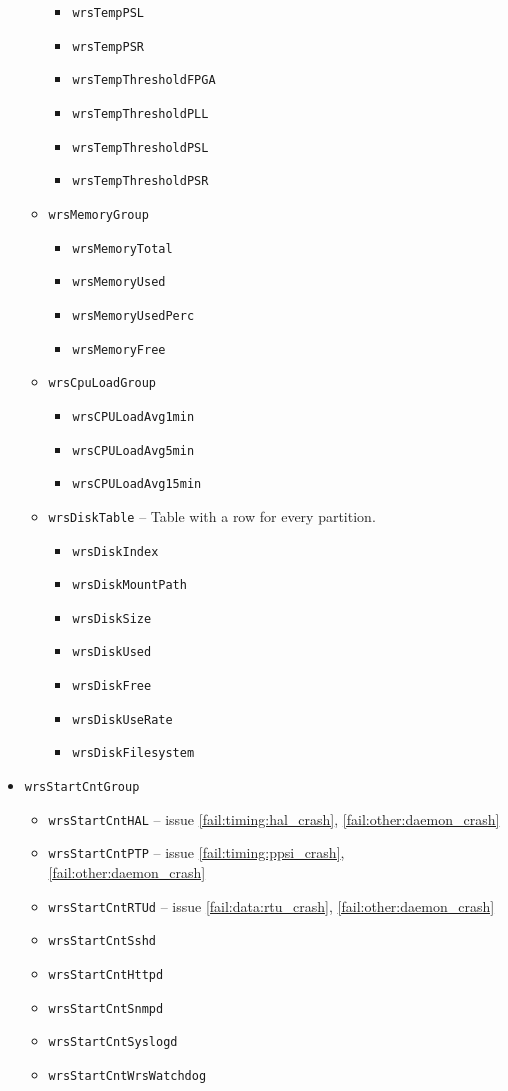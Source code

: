 \begin{itemize}
\begin{itemize}
\begin{itemize}
	  \item \texttt{wrsTempPSL}
	  \item \texttt{wrsTempPSR}
	  \item \texttt{wrsTempThresholdFPGA}
	  \item \texttt{wrsTempThresholdPLL}
	  \item \texttt{wrsTempThresholdPSL}
	  \item \texttt{wrsTempThresholdPSR}
	\end{itemize}
      \item \texttt{wrsMemoryGroup}
	\begin{itemize}
	  \item \texttt{wrsMemoryTotal}
	  \item \texttt{wrsMemoryUsed}
	  \item \texttt{wrsMemoryUsedPerc}
	  \item \texttt{wrsMemoryFree}
	\end{itemize}
      \item \texttt{wrsCpuLoadGroup}
	\begin{itemize}
	  \item \texttt{wrsCPULoadAvg1min}
	  \item \texttt{wrsCPULoadAvg5min}
	  \item \texttt{wrsCPULoadAvg15min}
	\end{itemize}
      \item \texttt{wrsDiskTable} -- Table with a row for every partition.
	\begin{itemize}
	  \item \texttt{wrsDiskIndex}
	  \item \texttt{wrsDiskMountPath}
	  \item \texttt{wrsDiskSize}
	  \item \texttt{wrsDiskUsed}
	  \item \texttt{wrsDiskFree}
	  \item \texttt{wrsDiskUseRate}
	  \item \texttt{wrsDiskFilesystem}
	\end{itemize}
    \end{itemize}

  \item \texttt{wrsStartCntGroup}
    \begin{itemize}
      \item \texttt{wrsStartCntHAL} -- issue \ref{fail:timing:hal_crash}, \ref{fail:other:daemon_crash}
      \item \texttt{wrsStartCntPTP} -- issue \ref{fail:timing:ppsi_crash}, \ref{fail:other:daemon_crash}
      \item \texttt{wrsStartCntRTUd} -- issue \ref{fail:data:rtu_crash}, \ref{fail:other:daemon_crash}
      \item \texttt{wrsStartCntSshd}
      \item \texttt{wrsStartCntHttpd}
      \item \texttt{wrsStartCntSnmpd}
      \item \texttt{wrsStartCntSyslogd}
      \item \texttt{wrsStartCntWrsWatchdog}
    \end{itemize}


\end{itemize}
